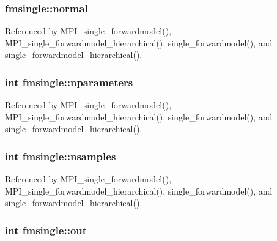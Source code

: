 \subsubsection[{\texorpdfstring{normal}{normal}}]{ fmsingle\+::normal}\hypertarget{structfmsingle_a70e043c1b30c30777ff0725ee90151a3}{}\label{structfmsingle_a70e043c1b30c30777ff0725ee90151a3}


Referenced by M\+P\+I\+\_\+single\+\_\+forwardmodel(), M\+P\+I\+\_\+single\+\_\+forwardmodel\+\_\+hierarchical(), single\+\_\+forwardmodel(), and single\+\_\+forwardmodel\+\_\+hierarchical().

\subsubsection[{\texorpdfstring{nparameters}{nparameters}}]{\setlength{\rightskip}{0pt plus 5cm}int fmsingle\+::nparameters}\hypertarget{structfmsingle_af08f6c83aca46c43c647e5ddb112e970}{}\label{structfmsingle_af08f6c83aca46c43c647e5ddb112e970}


Referenced by M\+P\+I\+\_\+single\+\_\+forwardmodel(), M\+P\+I\+\_\+single\+\_\+forwardmodel\+\_\+hierarchical(), single\+\_\+forwardmodel(), and single\+\_\+forwardmodel\+\_\+hierarchical().

\subsubsection[{\texorpdfstring{nsamples}{nsamples}}]{\setlength{\rightskip}{0pt plus 5cm}int fmsingle\+::nsamples}\hypertarget{structfmsingle_a24fbe662b9150ff39a04ca7be2e1350a}{}\label{structfmsingle_a24fbe662b9150ff39a04ca7be2e1350a}


Referenced by M\+P\+I\+\_\+single\+\_\+forwardmodel(), M\+P\+I\+\_\+single\+\_\+forwardmodel\+\_\+hierarchical(), single\+\_\+forwardmodel(), and single\+\_\+forwardmodel\+\_\+hierarchical().

\subsubsection[{\texorpdfstring{out}{out}}]{\setlength{\rightskip}{0pt plus 5cm}int fmsingle\+::out}\hypertarget{structfmsingle_ab1234622eb6c5c5ba6d9b4ea55e8b90c}{}\label{structfmsingle_ab1234622eb6c5c5ba6d9b4ea55e8b90c}


